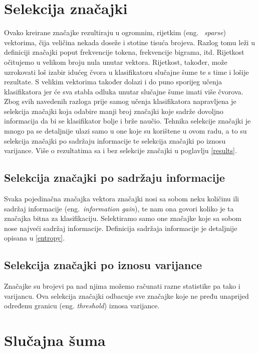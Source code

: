 \section{Selekcija značajki}
Ovako kreirane značajke rezultiraju u ogromnim, rijetkim (eng.~ \textit{sparse}) vektorima, čija veličina nekada doseže i stotine tisuća brojeva. Razlog tomu leži u definiciji značajki poput frekvencije tokena, frekvencije bigrama, itd. Rijetkost očitujemo u velikom broju nula unutar vektora. Rijetkost, također, može uzrokovati loš izabir idućeg čvora u klasifikatoru slučajne šume te s time i lošije rezultate. S velikim vektorima također dolazi i do puno sporijeg učenja klasifikatora jer će sva stabla odluka unutar slučajne šume imati više čvorova. Zbog svih navedenih razloga prije samog učenja klasifikatora napravljena je selekcija značajki koja odabire manji broj značajki koje sadrže dovoljno informacija da bi se klasifikator bolje i brže naučio. Tehnika selekcije značajki je mnogo pa se detaljnije ulazi samo u one koje su korištene u ovom radu, a to su selekcija značajki po sadržaju informacije te selekcija značajki po iznosu varijance. Više o rezultatima sa i bez selekcije značajki u poglavlju \ref{results}.

\subsection{Selekcija značajki po sadržaju informacije}

Svaka pojedinačna značajka vektora značajki nosi sa sobom neku količinu ili sadržaj informacije (eng.~\textit{information gain}), te nam ona govori koliko je ta značajka bitna za klasifikaciju. Selektiramo samo one značajke koje sa sobom nose najveći sadržaj informacije. Definicija sadržaja informacije je detaljnije opisana u \ref{entropy}.

\subsection{Selekcija značajki po iznosu varijance}

Značajke su brojevi pa nad njima možemo računati razne statistike pa tako i varijancu. Ova selekcija značajki odbacuje sve značajke koje ne pređu unaprijed određenu granicu (eng. \textit{threshold}) iznosa varijance.

\section{Slučajna šuma} \label{sec:rf}

